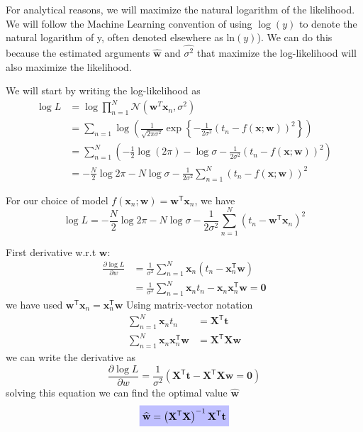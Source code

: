 For analytical reasons, we will maximize the natural logarithm of the likelihood.
We will follow the Machine Learning convention of using $\log(y)$ to denote the
natural logarithm of y, often denoted elsewhere as $\mathrm{ln}(y)$).
We can do this because the estimated arguments $\widehat{\mathbf{w}}$
and $\widehat{\sigma^2}$ that maximize the log-likelihood will also maximize
the likelihood.

We will start by writing the log-likelihood as
\begin{align*}
\log L & = \log \prod_{n=1}^{N} \mathcal{N}(\mathbf{w}^{T}\mathbf{x}_{n},\sigma^2) \\
& = \sum_{n=1} \log \left( \frac{1}{\sqrt{2\pi\sigma^2}}
\exp\left\{ -\frac{1}{2\sigma^2}
\left( t_{n} - f(\mathbf{x};\mathbf{w}) \right)^2
\right\} \right) \\
& = \sum_{n=1}^{N} \left(
-\frac{1}{2}\log(2\pi) - \log\sigma - \frac{1}{2\sigma^2}
\left( t_{n} - f(\mathbf{x};\mathbf{w}) \right)^2 \right) \\
& = -\frac{N}{2}\log 2\pi - N\log\sigma - \frac{1}{2\sigma^2}
\sum_{n=1}^{N} \left( t_{n} - f(\mathbf{x};\mathbf{w}) \right)^2
\end{align*}

For our choice of model
$f(\mathbf{x}_{n}; \mathbf{w}) = \mathbf{w}^{\mathsf{T}}\mathbf{x}_{n}$, we have
\begin{equation}
\log L = -\frac{N}{2} \log 2\pi - N\log\sigma - \frac{1}{2\sigma^2}
\sum_{n=1}^{N} \left( t_{n} - \mathbf{w}^{\mathsf{T}}\mathbf{x}_{n} \right)^2
\end{equation}

First derivative w.r.t $\mathbf{w}$:
\begin{align*}
\frac{\partial\log L}{\partial w} & = \frac{1}{\sigma^2}
\sum_{n=1}^{N} \mathbf{x}_{n} \left( t_{n} - \mathbf{x}^{\mathsf{T}}_{n} \mathbf{w} \right) \\
& = \frac{1}{\sigma^2}\sum_{n=1}^{N} \mathbf{x}_{n} t_{n} - 
\mathbf{x}_{n}\mathbf{x}_{n}^{\mathsf{T}}\mathbf{w}
= \mathbf{0}
\end{align*}
we have used
$\mathbf{w}^{\mathsf{T}}\mathbf{x}_{n} = \mathbf{x}_{n}^{\mathsf{T}}\mathbf{w}$
%
Using matrix-vector notation
\begin{align*}
\sum_{n=1}^{N} \mathbf{x}_{n} t_{n} & = \mathbf{X}^{\mathsf{T}}\mathbf{t} \\
\sum_{n=1}^{N} \mathbf{x}_{n} \mathbf{x}_{n}^{\mathsf{T}}\mathbf{w} & = 
\mathbf{X}^{\mathsf{T}}\mathbf{X}\mathbf{w}
\end{align*}
we can write the derivative as
\begin{equation}
\frac{\partial\log L}{\partial w} = \frac{1}{\sigma^2}\left(
\mathbf{X}^{\mathsf{T}}\mathbf{t} - \mathbf{X}^{\mathsf{T}}\mathbf{X}\mathbf{w} = \mathbf{0}
\right)
\end{equation}
solving this equation we can find the optimal value $\widehat{\mathbf{w}}$
\begin{equation}
\highlighteq{
\widehat{\mathbf{w}} = \left(\mathbf{X}^{\mathsf{T}}\mathbf{X}\right)^{-1}
\mathbf{X}^{\mathsf{T}}\mathbf{t}
}
\end{equation}

